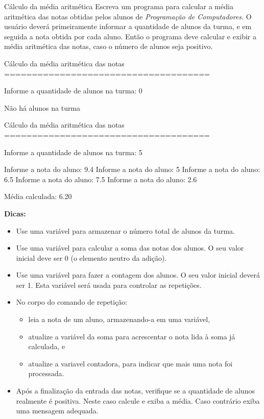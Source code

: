 \documentclass[11pt,fleqn]{practice}
\begin{document}
\newpage
\begin{task}[breakable]{Cálculo da média aritmética}{}
  Escreva um programa para calcular a média aritmética das notas obtidas
  pelos alunos de \emph{Programação de Computadores}. O usuário deverá
  primeiramente informar a quantidade de alunos da turma, e em seguida a
  nota obtida por cada aluno. Então o programa deve calcular e exibir a
  média aritmética das notas, caso o número de alunos seja positivo.

  \begin{runexample}
Cálculo da média aritmética das notas
=====================================

Informe a quantidade de alunos na turma: 0


Não há alunos na turma
  \end{runexample}

  \begin{runexample}
Cálculo da média aritmética das notas
=====================================

Informe a quantidade de alunos na turma: 5

Informe a nota do aluno: 9.4
Informe a nota do aluno: 5
Informe a nota do aluno: 6.5
Informe a nota do aluno: 7.5
Informe a nota do aluno: 2.6

Média calculada: 6.20
  \end{runexample}

  \textbf{Dicas:}\newline
  \begin{itemize}
    \item Use uma variável para armazenar o número total de alunos da
    turma.
    \item Use uma variável para calcular a soma das notas dos alunos. O
    seu valor inicial deve ser 0 (o elemento neutro da adição).
    \item Use uma variável para fazer a contagem dos alunos. O seu valor
    inicial deverá ser 1. Esta variável será usada para controlar as
    repetições.
    \item No corpo do comando de repetição:
    \begin{itemize}
      \item leia a nota de um aluno, armazenando-a em uma variável,
      \item atualize a variável da soma para acrescentar o nota lida à
      soma já calculada, e
      \item atualize a variavel contadora, para indicar que mais uma
      nota foi processada.
    \end{itemize}
    \item Após a finalização da entrada das notas, verifique se a
    quantidade de alunos realmente é positiva. Neste caso calcule e
    exiba a média. Caso contrário exiba uma mensagem adequada.
  \end{itemize}

  \tcblower
  \solution
\end{task}
\end{document}
